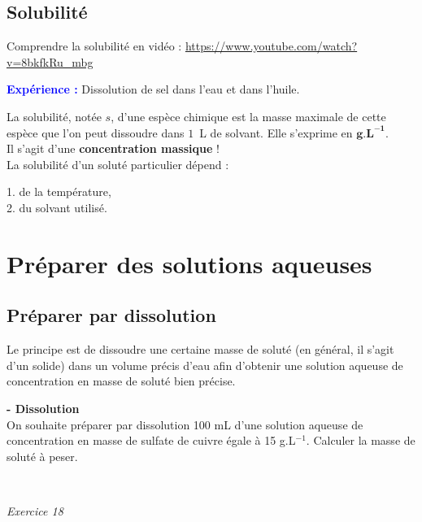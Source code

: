 \subsection{Solubilité}
Comprendre la solubilité en vidéo : \url{https://www.youtube.com/watch?v=8bkfkRu_mbg}\\
\begin{Large}
    \faFlask
\end{Large} \textcolor{blue}{\textbf{Expérience :}} Dissolution de sel dans l'eau et dans l'huile.
\begin{tcolorbox}[colback=green!5!white,colframe=green!75!black,title=\textbf{Définition}, upperbox=invisible]
La solubilité, notée $s$, d'une espèce chimique est la masse maximale de cette espèce que l'on peut dissoudre dans $1$~L de solvant. Elle s'exprime en $\mathbf{g.L^{-1}}$.\\
Il s'agit d'une \textbf{concentration massique} !\\

La solubilité d'un soluté particulier dépend : 
\begin{center}
   1. de la température,\\
   2. du solvant utilisé.
\end{center}
\end{tcolorbox}

\section{Préparer des solutions aqueuses}

\subsection{Préparer par dissolution}
Le principe est de dissoudre une certaine masse de soluté (en général, il s'agit d'un solide) dans un volume précis d'eau afin d'obtenir une solution aqueuse de concentration en masse de soluté bien précise.

\begin{tcolorbox}[colback=red!5!white,colframe=red!75!black,title=\textbf{Protocole de préparation de la dissolution (résumé) : }, upperbox=invisible]
    \vspace{10cm}
\end{tcolorbox}


\begin{mdframed}[style=autreexo]
\textbf{ - Dissolution}\\
On souhaite préparer par dissolution 100 mL d’une solution aqueuse de concentration en masse de sulfate de cuivre égale à 15 g.L$^{-1}$. Calculer la masse de soluté à peser.\end{mdframed}
\newline
{}\\
\begin{Large}
\end{Large}\textit{Exercice 18}

